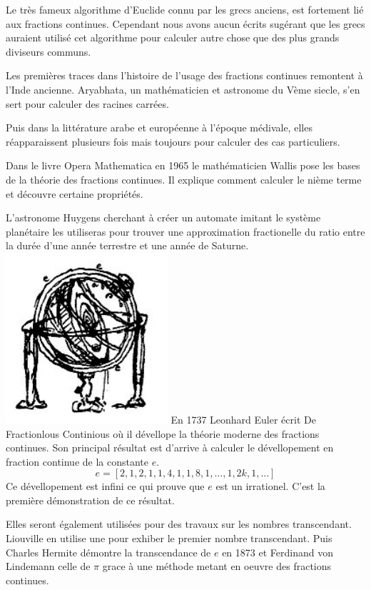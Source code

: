 Le très fameux algorithme d'Euclide connu par les grecs anciens, est fortement lié aux fractions continues. Cependant nous avons aucun écrits sugérant que les grecs auraient utilisé cet algorithme pour calculer autre chose que des plus grands diviseurs communs.\newline

Les premières traces dans l'histoire de l'usage des fractions continues remontent à l'Inde ancienne. Aryabhata, un mathématicien et astronome du Vème siecle, s'en sert pour calculer des racines carrées.\newline

Puis dans la littérature arabe et européenne à l'époque médivale, elles réapparaissent plusieurs fois mais toujours pour calculer des cas particuliers.\newline

Dans le livre Opera Mathematica en 1965 le mathématicien Wallis pose les bases de la théorie des fractions continues. Il explique comment calculer le nième terme et découvre certaine propriétés.\newline

L'astronome Huygens cherchant à créer un automate imitant le système planétaire les utiliseras pour trouver une approximation fractionelle du ratio entre la durée d'une année terrestre et une année de Saturne.\newline
\includegraphics[width=6cm]{Image/Automate_planetaire_de_Huygens.jpg}
En 1737 Leonhard Euler écrit De Fractionlous Continious où il dévellope la théorie moderne des fractions continues. Son principal résultat est d'arrive à calculer le dévellopement en fraction continue de la constante $e$. \[
e=[2,1,2,1,1,4,1,1,8,1,...,1,2k,1,...]
\]
Ce dévellopement est infini ce qui prouve que $e$ est un irrationel. C'est la première démonstration de ce résultat.\newline

Elles seront également utilisées pour des travaux sur les nombres transcendant. Liouville en utilise une pour exhiber le premier nombre transcendant. Puis Charles Hermite démontre la transcendance de $e$ en 1873 et Ferdinand von Lindemann celle de $\pi$ grace à une méthode metant en oeuvre des fractions continues. \newline%

